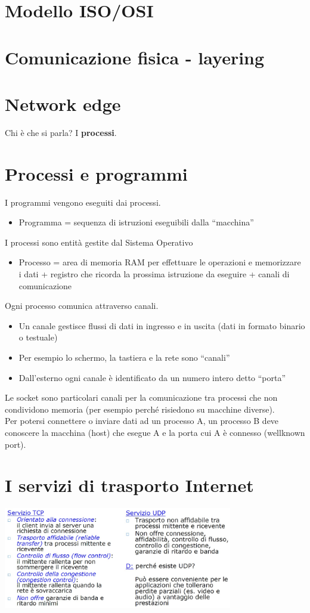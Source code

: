 \section{Modello ISO/OSI}

\section{Comunicazione fisica - layering}

\section{Network edge}
Chi è che si parla? I \textbf{processi}.

\section{Processi e programmi}
I programmi vengono eseguiti dai processi.
\begin{itemize}
    \item Programma = sequenza di istruzioni eseguibili dalla “macchina”
\end{itemize}
I processi sono entità gestite dal Sistema Operativo
\begin{itemize}
    \item Processo = area di memoria RAM per effettuare le operazioni e memorizzare i dati + registro che ricorda la prossima istruzione da eseguire + canali di comunicazione
\end{itemize}
Ogni processo comunica attraverso canali.
\begin{itemize}
    \item Un canale gestisce flussi di dati in ingresso e in uscita (dati in formato binario o testuale)
    \item Per esempio lo schermo, la tastiera e la rete sono “canali”
    \item Dall'esterno ogni canale è identificato da un numero intero detto “porta”
\end{itemize}
Le socket sono particolari canali per la comunicazione tra processi che non condividono memoria (per esempio perché risiedono su macchine diverse).
\\Per potersi connettere o inviare dati ad un processo A, un processo B deve conoscere la macchina (host) che esegue A e la porta cui A è connesso (wellknown port).

\section{I servizi di trasporto Internet}
\begin{center}
    \includegraphics[width=0.75\textwidth]{img/servizi_trasporto_internet1.jpg}
\end{center}

